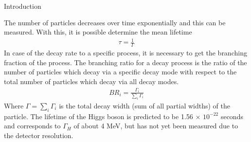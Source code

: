 \begin{chapter}{Introduction}

The number of particles decreases over time exponentially and this can be measured. With this, it is possible determine the mean lifetime\cite{griff}
\begin{align}
\tau=\frac{1}{\Gamma}
\end{align}
In case of the decay rate to a specific process, it is necessary to get the branching fraction of the process. 
The branching ratio for a decay process is the ratio of the number of particles which decay via a specific decay mode with respect to the total number of particles which decay via all decay modes.
\begin{align}
BR_i =\frac{\Gamma_i}{\sum_{i}\Gamma_i}
\end{align}
Where $\Gamma=\sum_i\Gamma_i$ is the total decay width (sum of all partial widths) of the particle.
The lifetime of the Higgs boson is predicted to be 1.56 $\times$ $10^{-22}$ seconds and corresponds to $\Gamma_H$ of about 4 MeV, but has not yet been measured due to the detector resolution\cite{cms-manual}.


\end{chapter}
